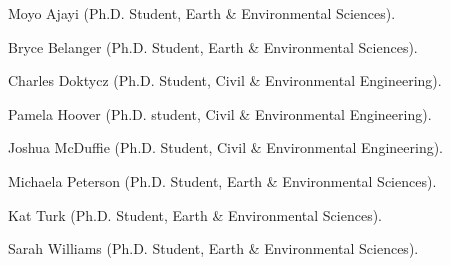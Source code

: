 \item Moyo Ajayi (Ph.D. Student, Earth \& Environmental Sciences).
\item Bryce Belanger (Ph.D. Student, Earth \& Environmental Sciences).
\item Charles Doktycz (Ph.D. Student, Civil \& Environmental Engineering).
\item Pamela Hoover (Ph.D. student, Civil \& Environmental Engineering).
\item Joshua McDuffie (Ph.D. Student, Civil \& Environmental Engineering).
\item Michaela Peterson (Ph.D. Student, Earth \& Environmental Sciences).
\item Kat Turk (Ph.D. Student, Earth \& Environmental Sciences).
\item Sarah Williams (Ph.D. Student, Earth \& Environmental Sciences).
